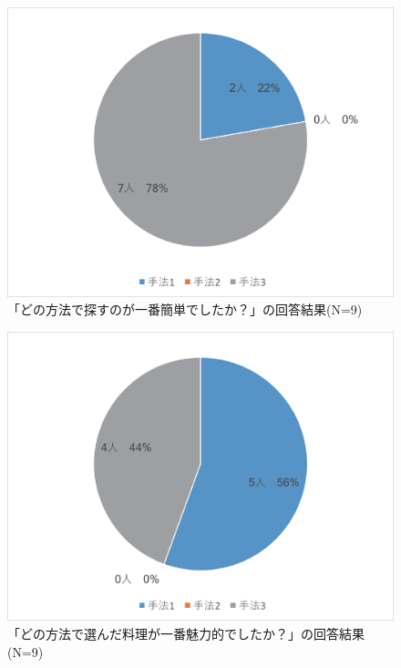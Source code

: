 \documentclass{funthesis}
\begin{document}
\begin{figure}[tbp]
  \begin{center}
    \includegraphics[clip,width=12cm]{5.1.eps}
    \caption[「どの方法で探すのが一番簡単でしたか？」の回答結果]{「どの方法で探すのが一番簡単でしたか？」の回答結果(N=9)}
  \end{center}
\end{figure}

\begin{figure}[tbp]
  \begin{center}
    \includegraphics[clip,width=12cm]{5.2.eps}
    \caption[「どの方法で選んだ料理が一番魅力的でしたか？」の回答結果]{「どの方法で選んだ料理が一番魅力的でしたか？」の回答結果(N=9)}
  \end{center}
\end{figure}
\end{document}
